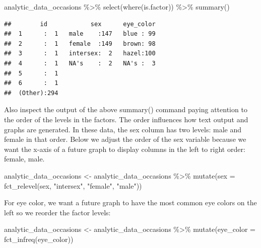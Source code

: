\documentclass[
]{krantz}
\makeatletter
\newenvironment{Shaded}{\begin{snugshade}}{\end{snugshade}}
\newcommand{\AttributeTok}[1]{\textcolor[rgb]{0.61,0.61,0.61}{#1}}
\newcommand{\FunctionTok}[1]{\textcolor[rgb]{0,0,0}{#1}}
\newcommand{\NormalTok}[1]{#1}
\newcommand{\OtherTok}[1]{\textcolor[rgb]{0.37,0.37,0.37}{#1}}
\newcommand{\SpecialCharTok}[1]{\textcolor[rgb]{0,0,0}{#1}}
\newcommand{\StringTok}[1]{\textcolor[rgb]{0.5,0.5,0.5}{#1}}
\newenvironment{kframe}{%
\medskip{}
\setlength{\fboxsep}{.8em}
 \def\at@end@of@kframe{}%
 \ifinner\ifhmode%
  \def\at@end@of@kframe{\end{minipage}}%
  \begin{minipage}{\columnwidth}%
 \fi\fi%
 \def\FrameCommand##1{\hskip\@totalleftmargin \hskip-\fboxsep
 \colorbox{shadecolor}{##1}\hskip-\fboxsep
     \hskip-\linewidth \hskip-\@totalleftmargin \hskip\columnwidth}%
 \MakeFramed {\advance\hsize-\width
   \@totalleftmargin\z@ \linewidth\hsize
   \@setminipage}}%
 {\par\unskip\endMakeFramed%
 \at@end@of@kframe}
\renewenvironment{Shaded}{\begin{kframe}}{\end{kframe}}
\makeatother
\begin{document}
\begin{Shaded}
\begin{Highlighting}[]
\NormalTok{analytic\_data\_occasions }\SpecialCharTok{\%\textgreater{}\%}
  \FunctionTok{select}\NormalTok{(}\FunctionTok{where}\NormalTok{(is.factor)) }\SpecialCharTok{\%\textgreater{}\%}
  \FunctionTok{summary}\NormalTok{()}
\end{Highlighting}
\end{Shaded}

\begin{verbatim}
##        id            sex      eye_color  
##  1      :  1   male    :147   blue : 99  
##  2      :  1   female  :149   brown: 98  
##  3      :  1   intersex:  2   hazel:100  
##  4      :  1   NA's    :  2   NA's :  3  
##  5      :  1                             
##  6      :  1                             
##  (Other):294
\end{verbatim}

Also inspect the output of the above summary() command paying attention to the order of the levels in the factors. The order influences how text output and graphs are generated. In these data, the sex column has two levels: male and female in that order. Below we adjust the order of the sex variable because we want the x-axis of a future graph to display columns in the left to right order: female, male.

\begin{Shaded}
\begin{Highlighting}[]
\NormalTok{analytic\_data\_occasions }\OtherTok{\textless{}{-}}\NormalTok{ analytic\_data\_occasions }\SpecialCharTok{\%\textgreater{}\%}
  \FunctionTok{mutate}\NormalTok{(}\AttributeTok{sex =} \FunctionTok{fct\_relevel}\NormalTok{(sex,}
                           \StringTok{"intersex"}\NormalTok{,}
                           \StringTok{"female"}\NormalTok{,}
                           \StringTok{"male"}\NormalTok{))}
\end{Highlighting}
\end{Shaded}

For eye color, we want a future graph to have the most common eye colors on the left so we reorder the factor levels:

\begin{Shaded}
\begin{Highlighting}[]
\NormalTok{analytic\_data\_occasions }\OtherTok{\textless{}{-}}\NormalTok{ analytic\_data\_occasions }\SpecialCharTok{\%\textgreater{}\%}
  \FunctionTok{mutate}\NormalTok{(}\AttributeTok{eye\_color =} \FunctionTok{fct\_infreq}\NormalTok{(eye\_color))}
\end{Highlighting}
\end{Shaded}
\end{document}

